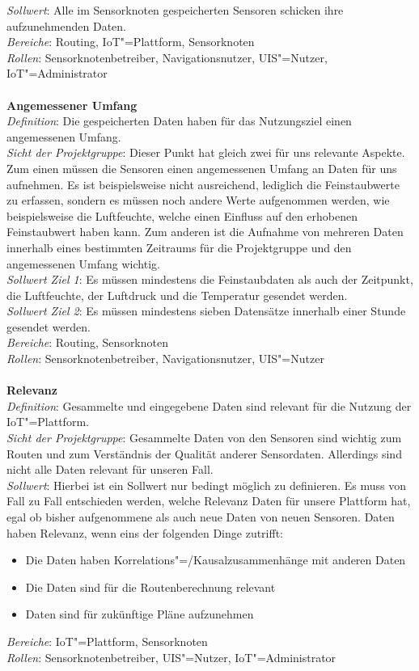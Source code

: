 \textit{Sollwert}: Alle im Sensorknoten gespeicherten Sensoren schicken ihre aufzunehmenden Daten.  \\
\textit{Bereiche}: Routing, IoT"=Plattform, Sensorknoten \\
\textit{Rollen}: Sensorknotenbetreiber, Navigationsnutzer, UIS"=Nutzer, IoT"=Administrator \\
\\
\textbf{Angemessener Umfang}\\
\textit{Definition}: Die gespeicherten Daten haben für das Nutzungsziel einen angemessenen Umfang.  \\
\textit{Sicht der Projektgruppe}: Dieser Punkt hat gleich zwei für uns relevante Aspekte. Zum einen müssen die Sensoren einen angemessenen Umfang an Daten für uns aufnehmen. Es ist beispielsweise nicht ausreichend, lediglich die Feinstaubwerte zu erfassen, sondern es müssen noch andere Werte aufgenommen werden, wie beispielsweise die Luftfeuchte, welche einen Einfluss auf den erhobenen Feinstaubwert haben kann. 
Zum anderen ist die Aufnahme von mehreren Daten innerhalb eines bestimmten Zeitraums für die Projektgruppe und den angemessenen Umfang wichtig. \\
\textit{Sollwert Ziel 1}: Es müssen mindestens die Feinstaubdaten als auch der Zeitpunkt, die Luftfeuchte, der Luftdruck und die Temperatur gesendet werden.  \\
\textit{Sollwert Ziel 2}: Es müssen mindestens sieben Datensätze innerhalb einer Stunde gesendet werden.  \\
\textit{Bereiche}: Routing, Sensorknoten \\
\textit{Rollen}: Sensorknotenbetreiber, Navigationsnutzer, UIS"=Nutzer \\
\\
\textbf{Relevanz}\\
\textit{Definition}: Gesammelte und eingegebene Daten sind relevant für die Nutzung der IoT"=Plattform.  \\
\textit{Sicht der Projektgruppe}: Gesammelte Daten von den Sensoren sind wichtig zum Routen und zum Verständnis der Qualität anderer Sensordaten. Allerdings sind nicht alle Daten relevant für unseren Fall.  \\
\textit{Sollwert}: Hierbei ist ein Sollwert nur bedingt möglich zu definieren. Es muss von Fall zu Fall entschieden werden, welche Relevanz Daten für unsere Plattform hat, egal ob bisher aufgenommene als auch neue Daten von neuen Sensoren.
Daten haben Relevanz, wenn eins der folgenden Dinge zutrifft:
\begin{itemize}
\item	Die Daten haben Korrelations"=/Kausalzusammenhänge mit anderen Daten
\item	Die Daten sind für die Routenberechnung relevant
\item	Daten sind für zukünftige Pläne aufzunehmen
\end{itemize}
\textit{Bereiche}: IoT"=Plattform, Sensorknoten \\
\textit{Rollen}: Sensorknotenbetreiber, UIS"=Nutzer, IoT"=Administrator \\

